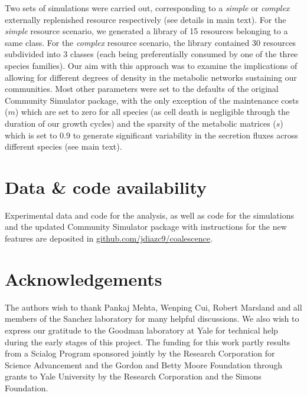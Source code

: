 \documentclass[a4paper,10pt]{article}
\begin{document}
Two sets of simulations were carried out, corresponding to a
\textit{simple} or \textit{complex} externally replenished resource respectively
(see details in main text).
For the \textit{simple} resource scenario, we generated a library of 15 resources
belonging to a same class. For the \textit{complex} resource scenario,
the library contained 30 resources subdivided into 3 classes
(each being preferentially consumed by one of the three species families).
Our aim with this approach was to examine the implications of allowing for
different degrees of density in the metabolic networks sustaining our communities.
Most other parameters were set to the defaults of the original Community Simulator
package, with the only exception of the maintenance costs ($m$) which are set to
zero for all species (as cell death is negligible through the duration of our growth cycles)
and the sparsity of the metabolic matrices ($s$) which is set to 0.9
to generate significant variability in the secretion fluxes across different species
(see main text).

\section*{Data \& code availability}\label{datacode}

Experimental data and code for the analysis, as well as code for the simulations
and the updated Community Simulator package with instructions for the
new features are deposited in \url{github.com/jdiazc9/coalescence}.

\section*{Acknowledgements}

The authors wish to thank Pankaj Mehta, Wenping Cui,
Robert Marsland and all members of the Sanchez laboratory
for many helpful discussions.
We also wish to express our gratitude to the Goodman laboratory at Yale
for technical help during the early stages of this project.
The funding for this work partly results from a Scialog Program
sponsored jointly by the Research Corporation for Science Advancement and
the Gordon and Betty Moore Foundation through grants to Yale University by the
Research Corporation and the Simons Foundation.








\clearpage

\clearpage


\end{document}
